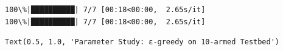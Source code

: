 \documentclass[11pt]{ctexart}
\makeatletter
\newcommand{\boxspacing}{\kern\kvtcb@left@rule\kern\kvtcb@boxsep}
\newcommand{\prompt}[4]{
        {\ttfamily\llap{{\color{#2}[#3]:\hspace{3pt}#4}}\vspace{-\baselineskip}}
    }
\makeatother
\begin{document}
    \begin{Verbatim}[commandchars=\\\{\}]
100\%|██████████| 7/7 [00:18<00:00,  2.65s/it]
100\%|██████████| 7/7 [00:18<00:00,  2.65s/it]
    \end{Verbatim}

            \begin{tcolorbox}[breakable, size=fbox, boxrule=.5pt, pad at break*=1mm, opacityfill=0]
\prompt{Out}{outcolor}{19}{\boxspacing}
\begin{Verbatim}[commandchars=\\\{\}]
Text(0.5, 1.0, 'Parameter Study: ε-greedy on 10-armed Testbed')
\end{Verbatim}
\end{tcolorbox}
        
    \begin{center}
    \end{center}
    { \hspace*{\fill} \\}
    
\end{document}
